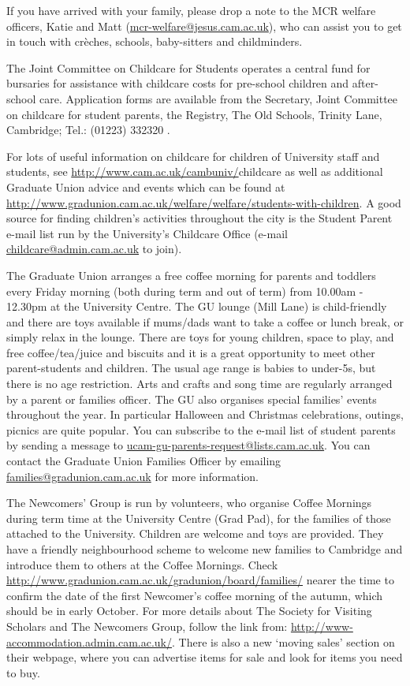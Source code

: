\documentclass[11pt,fleqn, oneside]{book} %
\begin{document}
If you have arrived with your family, please drop a note to the MCR welfare officers, Katie and Matt (\url{mcr-welfare@jesus.cam.ac.uk}), who can assist you to get in touch with crèches, schools, baby-sitters and childminders. 
   
The Joint Committee on Childcare for Students operates a central fund for bursaries for assistance with childcare costs for pre-school children and after-school care. Application forms are available from the Secretary, Joint Committee on childcare for student parents, the Registry, The Old Schools, Trinity Lane, Cambridge; Tel.: (01223) 332320 .  
   
For lots of useful information on childcare for children of University staff and students, see \url{http://www.cam.ac.uk/cambuniv/}childcare as well as additional Graduate Union advice and events which can be found at
\url{http://www.gradunion.cam.ac.uk/welfare/welfare/students-with-children}.
 A good source for finding children’s activities throughout the city is the Student Parent e-mail list run by the University’s Childcare Office (e-mail \url{childcare@admin.cam.ac.uk} to join).
   
The Graduate Union arranges a free coffee morning for parents and toddlers every Friday morning (both during term and out of term) from 10.00am - 12.30pm at the University Centre. The GU lounge (Mill Lane) is child-friendly and there are toys available if mums/dads want to take a coffee or lunch break, or simply relax in the lounge. There are toys for young children, space to play, and free coffee/tea/juice and biscuits and it is a great opportunity to meet other parent-students and children. The usual age range is babies to under-5s, but there is no age restriction. Arts and crafts and song time are regularly arranged by a parent or families officer. 
The GU also organises special families’ events throughout the year. In particular Halloween and Christmas celebrations, outings, picnics are quite popular. You can subscribe to the e-mail list of student parents by sending a message to \url{ucam-gu-parents-request@lists.cam.ac.uk}. You can contact the Graduate Union Families Officer by emailing \url{families@gradunion.cam.ac.uk} for more information. 
   
The Newcomers' Group is run by volunteers, who organise Coffee Mornings during term time at the University Centre (Grad Pad), for the families of those attached to the University.  Children are welcome and toys are provided.  They have a friendly neighbourhood scheme to welcome new families to Cambridge and introduce them to others at the Coffee Mornings.  Check
\url{http://www.gradunion.cam.ac.uk/gradunion/board/families/}
nearer the time to confirm the date of the first Newcomer’s coffee morning of the autumn, which should be in early October.
For more details about The Society for Visiting Scholars and The Newcomers Group, follow the link from: \url{http://www-accommodation.admin.cam.ac.uk/}. There is also a new ‘moving sales’ section on their webpage, where you can advertise items for sale and look for items you need to buy.  
   
\end{document}

